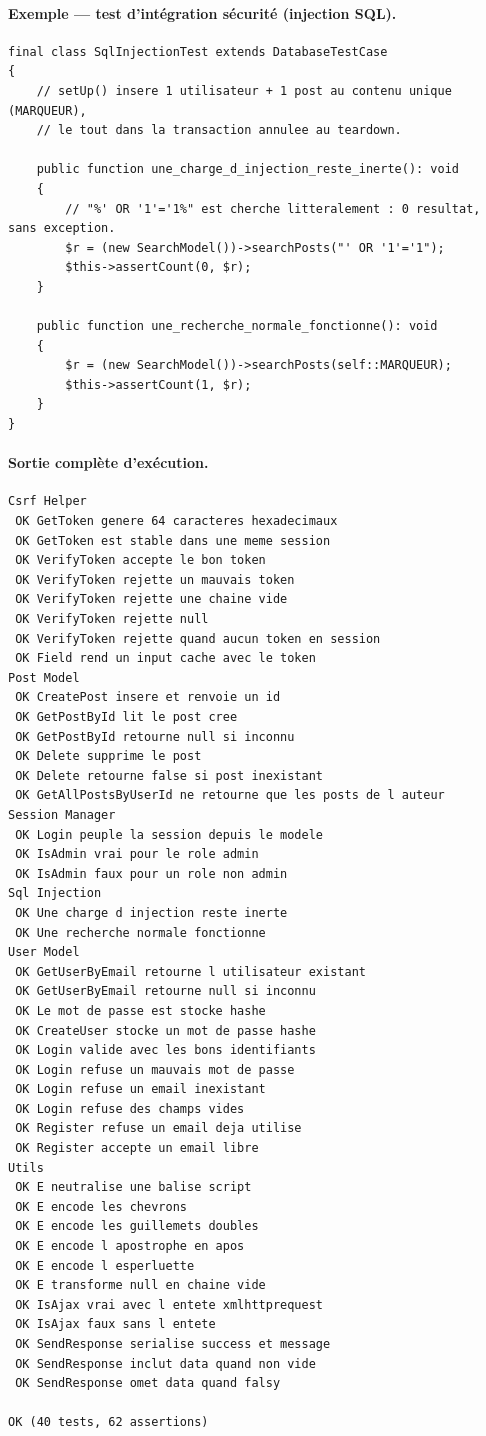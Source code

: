 \paragraph{Exemple — test d'intégration sécurité (injection SQL).}

\begin{lstlisting}[style=php, caption={\file{tests/Integration/SqlInjectionTest.php} (extrait)}]
final class SqlInjectionTest extends DatabaseTestCase
{
    // setUp() insere 1 utilisateur + 1 post au contenu unique (MARQUEUR),
    // le tout dans la transaction annulee au teardown.

    public function une_charge_d_injection_reste_inerte(): void
    {
        // "%' OR '1'='1%" est cherche litteralement : 0 resultat, sans exception.
        $r = (new SearchModel())->searchPosts("' OR '1'='1");
        $this->assertCount(0, $r);
    }

    public function une_recherche_normale_fonctionne(): void
    {
        $r = (new SearchModel())->searchPosts(self::MARQUEUR);
        $this->assertCount(1, $r);
    }
}
\end{lstlisting}

\paragraph{Sortie complète d'exécution.}

\begin{lstlisting}[style=text, caption={\code{php vendor/bin/phpunit --testdox}}]
Csrf Helper
 OK GetToken genere 64 caracteres hexadecimaux
 OK GetToken est stable dans une meme session
 OK VerifyToken accepte le bon token
 OK VerifyToken rejette un mauvais token
 OK VerifyToken rejette une chaine vide
 OK VerifyToken rejette null
 OK VerifyToken rejette quand aucun token en session
 OK Field rend un input cache avec le token
Post Model
 OK CreatePost insere et renvoie un id
 OK GetPostById lit le post cree
 OK GetPostById retourne null si inconnu
 OK Delete supprime le post
 OK Delete retourne false si post inexistant
 OK GetAllPostsByUserId ne retourne que les posts de l auteur
Session Manager
 OK Login peuple la session depuis le modele
 OK IsAdmin vrai pour le role admin
 OK IsAdmin faux pour un role non admin
Sql Injection
 OK Une charge d injection reste inerte
 OK Une recherche normale fonctionne
User Model
 OK GetUserByEmail retourne l utilisateur existant
 OK GetUserByEmail retourne null si inconnu
 OK Le mot de passe est stocke hashe
 OK CreateUser stocke un mot de passe hashe
 OK Login valide avec les bons identifiants
 OK Login refuse un mauvais mot de passe
 OK Login refuse un email inexistant
 OK Login refuse des champs vides
 OK Register refuse un email deja utilise
 OK Register accepte un email libre
Utils
 OK E neutralise une balise script
 OK E encode les chevrons
 OK E encode les guillemets doubles
 OK E encode l apostrophe en apos
 OK E encode l esperluette
 OK E transforme null en chaine vide
 OK IsAjax vrai avec l entete xmlhttprequest
 OK IsAjax faux sans l entete
 OK SendResponse serialise success et message
 OK SendResponse inclut data quand non vide
 OK SendResponse omet data quand falsy

OK (40 tests, 62 assertions)
\end{lstlisting}

